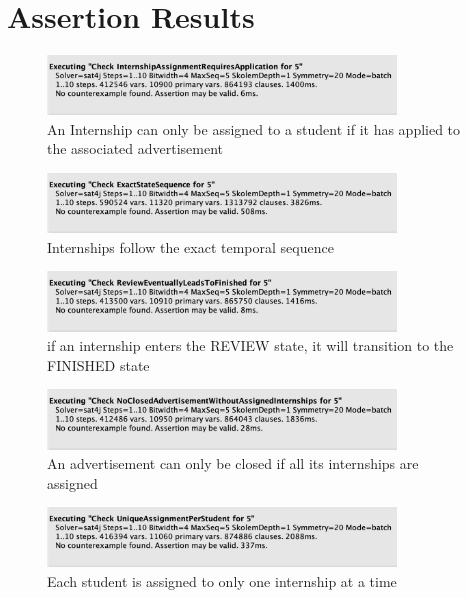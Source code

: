 \section{Assertion Results}

\begin{figure}[H]
    \centering
    \includegraphics[width=350px]{../../assets/alloy-assertion/I-assertion.png}
    \caption*{An Internship can only be assigned to a student if it has applied to the associated advertisement}
\end{figure}

\begin{figure}[H]
    \centering
    \includegraphics[width=350px]{../../assets/alloy-assertion/II-assertion.png}
    \caption*{Internships follow the exact temporal sequence}
\end{figure}

\begin{figure}[H]
    \centering
    \includegraphics[width=350px]{../../assets/alloy-assertion/III-assertion.png}
    \caption*{if an internship enters the REVIEW state, it will transition to the FINISHED state}
\end{figure}

\begin{figure}[H]
    \centering
    \includegraphics[width=350px]{../../assets/alloy-assertion/IV-assertion.png}
    \caption*{An advertisement can only be closed if all its internships are assigned}
\end{figure}

\begin{figure}[H]
    \centering
    \includegraphics[width=350px]{../../assets/alloy-assertion/V-assertion.png}
    \caption*{Each student is assigned to only one internship at a time}
\end{figure}

